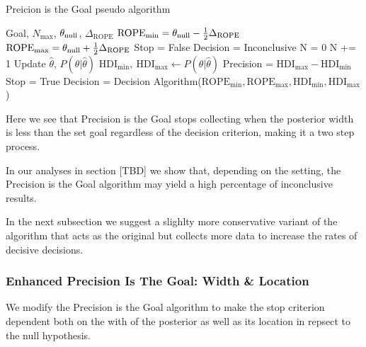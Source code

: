 \begin{algorithm}
    \caption{Preicion is the Goal pseudo algorithm}\label{alg:pitg}
    \begin{algorithmic}
    \Require Goal, $N_\mathrm{max}$, $\theta_{\rm null}$, $\Delta_\mathrm{ROPE}$
    \State $\mathrm{ROPE}_\mathrm{min} = \theta_{\rm null} - \frac{1}{2}\Delta_\mathrm{ROPE}$
    \State $\mathrm{ROPE}_\mathrm{max} = \theta_{\rm null} + \frac{1}{2}\Delta_\mathrm{ROPE}$
    \State Stop = False
    \State Decision = Inconclusive
    \State N = 0
    \State N += 1  
    \State Update $\hat\theta$, $P(\theta|\hat\theta)$  
    \State $\mathrm{HDI}_\mathrm{min}, \ \mathrm{HDI}_\mathrm{max}  \gets P(\theta|\hat\theta)$
    \State Precision = $\mathrm{HDI}_\mathrm{max} - \mathrm{HDI}_\mathrm{min}$
         \State \HiLi Stop = True 
         \State Decision = Decision Algorithm($\mathrm{ROPE}_\mathrm{min}, \mathrm{ROPE}_\mathrm{max}, \mathrm{HDI}_\mathrm{min}, \mathrm{HDI}_\mathrm{max}$)  
    \EndIf
    \EndWhile
    \end{algorithmic}
\end{algorithm}

Here we see that Precision is the Goal stops collecting when the posterior width is less than
the set goal regardless of the decision criterion, making it a two step process.


In our analyses in section [TBD] we show that, depending on the setting,
the Precision is the Goal algorithm may yield a high percentage of inconclusive results.

In the next subsection we suggest a slighlty more conservative variant of the algorithm
that acts as the original but collects more data to increase the rates
of decisive decisions.

\subsubsection{Enhanced Precision Is The Goal: Width \& Location}

We modify the \cite{kruschke2015doing} Precision is the Goal algorithm
to make the stop criterion dependent both on the with of the posterior
as well as its location in repsect to the null hypothesis.

